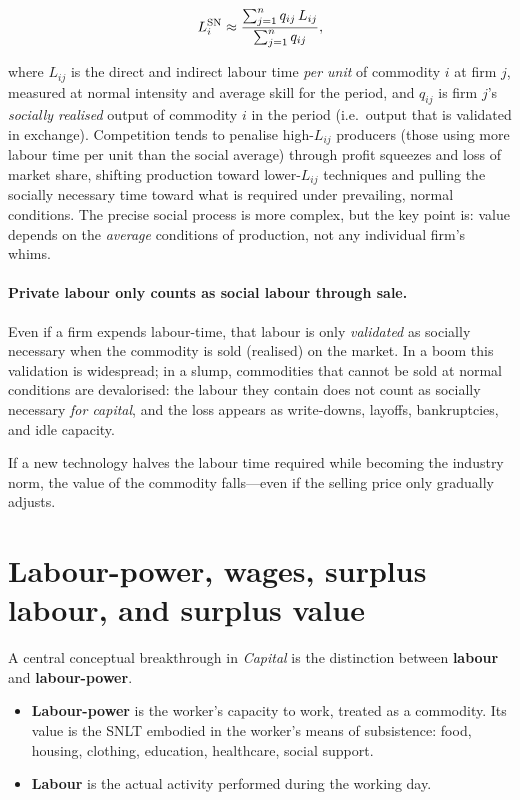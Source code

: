 \begin{equation}
  L^{\mathrm{SN}}_{i} \approx
  \frac{\sum_{j=1}^{n} q_{ij}\,L_{ij}}{\sum_{j=1}^{n} q_{ij}},
  \label{eq:snlt}
\end{equation}

where $L_{ij}$ is the direct and indirect labour time \emph{per unit} of commodity $i$
at firm $j$, measured at normal intensity and average skill for the period, and
$q_{ij}$ is firm $j$'s \emph{socially realised} output of commodity $i$ in the period
(i.e.\ output that is validated in exchange). Competition tends to penalise high-$L_{ij}$
producers (those using more labour time per unit than the social average) through
profit squeezes and loss of market share, shifting production toward lower-$L_{ij}$
techniques and pulling the socially necessary time toward what is required under
prevailing, normal conditions. The precise social process is more complex, but the key
point is: value depends on the \emph{average} conditions of production, not any individual
firm's whims.

\paragraph{Private labour only counts as social labour through sale.}
Even if a firm expends labour-time, that labour is only \emph{validated} as socially necessary
when the commodity is sold (realised) on the market. In a boom this validation is widespread;
in a slump, commodities that cannot be sold at normal conditions are devalorised: the labour
they contain does not count as socially necessary \emph{for capital}, and the loss appears as
write-downs, layoffs, bankruptcies, and idle capacity.\cite{Marx1867}

If a new technology halves the labour time required while becoming the
industry norm, the value of the commodity falls—even if the selling price
only gradually adjusts.


\section{Labour-power, wages, surplus labour, and surplus value}
\label{sec:labour-surplus}

A central conceptual breakthrough in \emph{Capital} is the distinction between
\textbf{labour} and \textbf{labour-power}.\cite{Marx1867}

\begin{itemize}[leftmargin=1.5em]
  \item \textbf{Labour-power} is the worker's capacity to work, treated as a
  commodity. Its value is the SNLT embodied in the worker's means of
  subsistence: food, housing, clothing, education, healthcare, social
  support.
  \item \textbf{Labour} is the actual activity performed during the working
  day.
\end{itemize}

